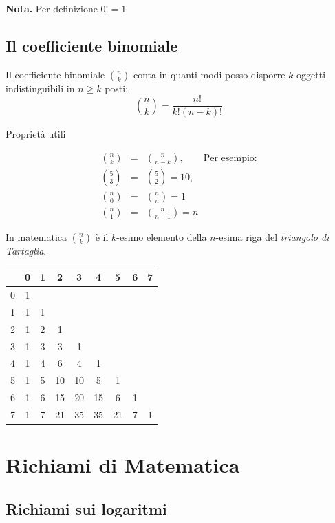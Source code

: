\documentclass[
  11pt,
]{book}
\theoremstyle{mytheoremstyle}
\theoremstyle{mydefstyle}
\begin{document}
\textbf{Nota.} Per definizione \(0!=1\)

\section{Il coefficiente binomiale}\label{il-coefficiente-binomiale}

Il coefficiente binomiale \(\binom{n}{k}\) conta in quanti modi posso disporre \(k\) oggetti indistinguibili in \(n\ge k\) posti:
\[\binom{n}{ k}=\frac {n!}{k!(n-k)!}\]

Proprietà utili

\begin{eqnarray*}
  \binom{n}{ k} &=&\binom{n}{ n-k},\qquad\text{Per esempio:} \\
  \binom{5}{ 3} &=&\binom{5}{ 2}=10,\\
  \binom{n}{ 0} &=&\binom{n}{ n} = 1 \\
  \binom{n}{ 1} &=&\binom{n}{ n-1}=n 
\end{eqnarray*}

In matematica \(\binom{n}{ k}\) è il \(k\)-esimo elemento della \(n\)-esima riga del \emph{triangolo di Tartaglia}.

\begin{tabular}{lcccccccc}
\toprule
  & 0 & 1 & 2 & 3 & 4 & 5 & 6 & 7\\
\midrule
0 & 1 &  &  &  &  &  &  & \\
1 & 1 & 1 &  &  &  &  &  & \\
2 & 1 & 2 & 1 &  &  &  &  & \\
3 & 1 & 3 & 3 & 1 &  &  &  & \\
4 & 1 & 4 & 6 & 4 & 1 &  &  & \\
5 & 1 & 5 & 10 & 10 & 5 & 1 &  & \\
6 & 1 & 6 & 15 & 20 & 15 & 6 & 1 & \\
7 & 1 & 7 & 21 & 35 & 35 & 21 & 7 & 1\\
\bottomrule
\end{tabular}

\chapter{Richiami di Matematica}\label{richiami-di-matematica}

\section{Richiami sui logaritmi}\label{richiami-sui-logaritmi}
\end{document}
